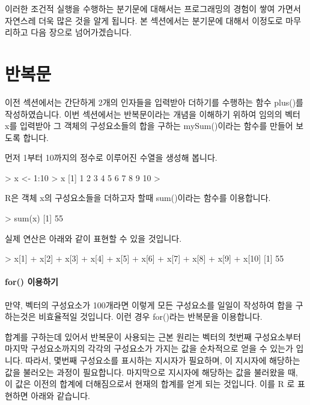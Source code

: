 \documentclass{book}
\begin{document}
이러한 조건적 실행을 수행하는 분기문에 대해서는 프로그래밍의 경험이 쌓여 가면서 자연스레 더욱 많은 것을 알게 됩니다. 
본 섹션에서는 분기문에 대해서 이정도로 마무리하고 다음 장으로 넘어가겠습니다. 


\section{반복문}

이전 섹션에서는 간단하게 2개의 인자들을 입력받아 더하기를 수행하는 함수 plus()를 작성하였습니다.
이번 섹션에서는 반복문이라는 개념을 이해하기 위하여 임의의 벡터 x를 입력받아 그 객체의 구성요소들의 합을 구하는 mySum()이라는 함수를 만들어 보도록 합니다. 

먼저 1부터 10까지의 정수로 이루어진 수열을 생성해 봅니다.

\begin{Schunk}
\begin{Soutput}
> x <- 1:10
> x
 [1]  1  2  3  4  5  6  7  8  9 10
> 
\end{Soutput}
\end{Schunk}

R은 객체 x의 구성요소들을 더하고자 할때 sum()이라는 함수를 이용합니다.

\begin{Schunk}
\begin{Soutput}
> sum(x)
[1] 55
\end{Soutput}
\end{Schunk}

실제 연산은 아래와 같이 표현할 수 있을 것입니다.

\begin{Schunk}
\begin{Soutput}
> x[1] + x[2] + x[3] + x[4] + x[5] + x[6] + x[7] + x[8] + x[9] + x[10]
[1] 55
\end{Soutput}
\end{Schunk}

\paragraph{for() 이용하기}

만약, 벡터의 구성요소가 100개라면 이렇게 모든 구성요소를 일일이 작성하여 합을 구하는것은 비효율적일 것입니다. 
이런 경우 for()라는 반복문을 이용합니다. 

합계를 구하는데 있어서 반복문이 사용되는 근본 원리는 벡터의 첫번째 구성요소부터 마지막 구성요소까지의 각각의 구성요소가 가지는 값을 순차적으로 얻을 수 있는가 입니다.
따라서, 몇번째 구성요소를 표시하는 지시자가 필요하며, 이 지시자에 해당하는 값을 불러오는 과정이 필요합니다.
마지막으로 지시자에 해당하는 값을 불러왔을 때, 이 값은 이전의 합계에 더해짐으로서 현재의 합계를 얻게 되는 것입니다.
이를 R 로 표현하면 아래와 같습니다. 
\end{document}
